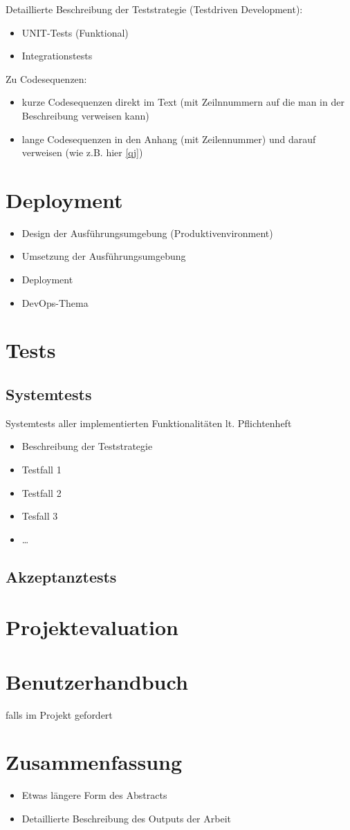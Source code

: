 Detaillierte Beschreibung der Teststrategie (Testdriven Development):

\begin{itemize}
	\item UNIT-Tests (Funktional)
	\item Integrationstests
\end{itemize}

Zu Codesequenzen:
\begin{itemize}
	\item kurze Codesequenzen direkt im Text (mit Zeilnnummern auf die man in der Beschreibung verweisen kann)
	\item lange Codesequenzen in den Anhang (mit Zeilennummer) und darauf verweisen (wie z.B. hier \cref{qj})
\end{itemize}

\chapter{Deployment}
\begin{itemize}
	\item Design der Ausführungsumgebung (Produktivenvironment)
	\item Umsetzung der Ausführungsumgebung
	\item Deployment
	\item DevOps-Thema
\end{itemize}

\chapter{Tests}

\section{Systemtests} 
Systemtests aller implementierten Funktionalitäten lt. Pflichtenheft
\begin{itemize}
	\item Beschreibung der Teststrategie
	\item Testfall 1
	\item Testfall 2
	\item Tesfall 3
	\item …
\end{itemize}

\section{Akzeptanztests}

\chapter{Projektevaluation}



\chapter{Benutzerhandbuch} 
falls im Projekt gefordert

\chapter{Zusammenfassung}
\begin{itemize}
	\item Etwas längere Form des Abstracts
	\item Detaillierte Beschreibung des Outputs der Arbeit
\end{itemize}